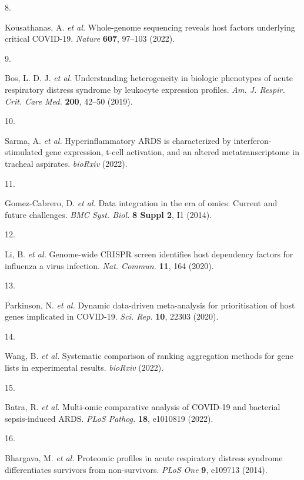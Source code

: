 \documentclass[
  11,
  a4paper,
]{article}
\newlength{\cslhangindent}
\newlength{\csllabelwidth}
\newlength{\cslentryspacingunit} %
\newenvironment{CSLReferences}[2] %
 {%
  \setlength{\parindent}{0pt}
  \ifodd #1
  \let\oldpar\par
  \def\par{\hangindent=\cslhangindent\oldpar}
  \fi
  \setlength{\parskip}{#2\cslentryspacingunit}
 }%
 {}
\newcommand{\CSLLeftMargin}[1]{\parbox[t]{\csllabelwidth}{#1}}
\newcommand{\CSLRightInline}[1]{\parbox[t]{\linewidth - \csllabelwidth}{#1}\break}
\begin{document}
\begin{CSLReferences}{0}{0}
\leavevmode{}%
\CSLLeftMargin{8. }%
\CSLRightInline{Kousathanas, A. \emph{et al.} Whole-genome sequencing
reveals host factors underlying critical {COVID-19}. \emph{Nature}
\textbf{607}, 97--103 (2022).}

\leavevmode{}%
\CSLLeftMargin{9. }%
\CSLRightInline{Bos, L. D. J. \emph{et al.} Understanding heterogeneity
in biologic phenotypes of acute respiratory distress syndrome by
leukocyte expression profiles. \emph{Am. J. Respir. Crit. Care Med.}
\textbf{200}, 42--50 (2019).}

\leavevmode{}%
\CSLLeftMargin{10. }%
\CSLRightInline{Sarma, A. \emph{et al.} Hyperinflammatory {ARDS} is
characterized by interferon-stimulated gene expression, t-cell
activation, and an altered metatranscriptome in tracheal aspirates.
\emph{bioRxiv} (2022).}

\leavevmode{}%
\CSLLeftMargin{11. }%
\CSLRightInline{Gomez-Cabrero, D. \emph{et al.} Data integration in the
era of omics: Current and future challenges. \emph{BMC Syst. Biol.}
\textbf{8 Suppl 2}, I1 (2014).}

\leavevmode{}%
\CSLLeftMargin{12. }%
\CSLRightInline{Li, B. \emph{et al.} Genome-wide {CRISPR} screen
identifies host dependency factors for influenza a virus infection.
\emph{Nat. Commun.} \textbf{11}, 164 (2020).}

\leavevmode{}%
\CSLLeftMargin{13. }%
\CSLRightInline{Parkinson, N. \emph{et al.} Dynamic data-driven
meta-analysis for prioritisation of host genes implicated in {COVID-19}.
\emph{Sci. Rep.} \textbf{10}, 22303 (2020).}

\leavevmode{}%
\CSLLeftMargin{14. }%
\CSLRightInline{Wang, B. \emph{et al.} Systematic comparison of ranking
aggregation methods for gene lists in experimental results.
\emph{bioRxiv} (2022).}

\leavevmode{}%
\CSLLeftMargin{15. }%
\CSLRightInline{Batra, R. \emph{et al.} Multi-omic comparative analysis
of {COVID-19} and bacterial sepsis-induced {ARDS}. \emph{PLoS Pathog.}
\textbf{18}, e1010819 (2022).}

\leavevmode{}%
\CSLLeftMargin{16. }%
\CSLRightInline{Bhargava, M. \emph{et al.} Proteomic profiles in acute
respiratory distress syndrome differentiates survivors from
non-survivors. \emph{PLoS One} \textbf{9}, e109713 (2014).}


\end{CSLReferences}
\end{document}
